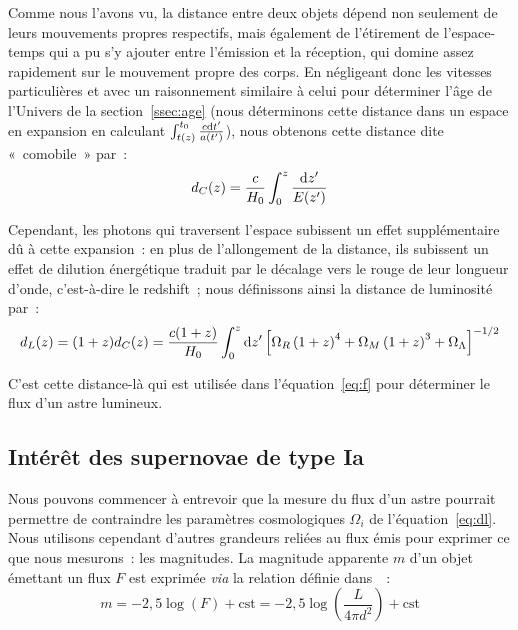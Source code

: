 \documentclass[../main/main.tex]{subfiles}
\begin{document}
Comme nous l'avons vu, la distance entre deux objets dépend non seulement de
leurs mouvements propres respectifs, mais également de l'étirement de
l'espace-temps qui a pu s'y ajouter entre l'émission et la réception, qui domine
assez rapidement sur le mouvement propre des corps. En négligeant donc les
vitesses particulières et avec un raisonnement similaire à celui pour déterminer
l'âge de l'Univers de la section~\ref{ssec:age} (nous déterminons cette distance
dans un espace en expansion en calculant $\int_{t(z)}^{t_0} \frac{c\mathrm{d}
t'}{a(t')}$), nous obtenons cette distance dite «~comobile~» par~:
\begin{equation}
    d_C(z) = \frac{c}{H_0} \int_{0}^{z} \frac{\mathrm{d} z'}{E(z')}
\end{equation}

Cependant, les photons qui traversent l'espace subissent un effet supplémentaire
dû à cette expansion~: en plus de l'allongement de la distance, ils subissent un
effet de dilution énergétique traduit par le décalage vers le rouge de leur
longueur d'onde, c'est-à-dire le redshift~; nous définissons ainsi la distance
de luminosité par~:
\begin{equation}\label{eq:dl}
    d_L(z) = (1+z)d_C(z) = \frac{c(1+z)}{H_0} \int_{0}^{z} \d z'
    \left[
        \Omega_R \left( 1+z \right)^4 +
        \Omega_M \left( 1+z \right)^3 +
        \Omega_\Lambda %
    \right]^{-1/2}
\end{equation}

C'est cette distance-là qui est utilisée dans l'équation~\ref{eq:f} pour
déterminer le flux d'un astre lumineux.

\subsection{Intérêt des supernovae de type Ia}\label{ssec:intsne}

Nous pouvons commencer à entrevoir que la mesure du flux d'un astre pourrait
permettre de contraindre les paramètres cosmologiques $\Omega_i$ de
l'équation~\ref{eq:dl}. Nous utilisons cependant d'autres grandeurs reliées au
flux émis pour exprimer ce que nous mesurons~: les magnitudes. La magnitude
apparente $m$ d'un objet émettant un flux $F$ est exprimée \textit{via} la
relation définie dans~\cite{pogson1856}~:
\begin{equation}\label{eq:m}
    m = -2,5\log \left(F\right) + \text{cst} =
    -2,5\log \left( \frac{L}{4\pi d^2} \right) + \text{cst}
\end{equation}
\end{document}
